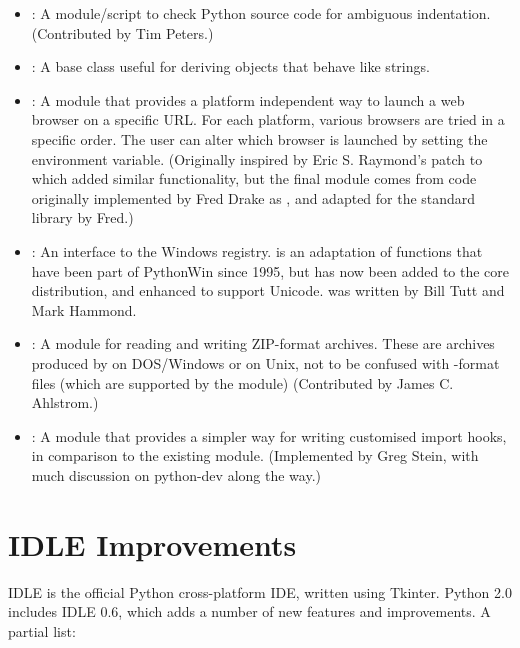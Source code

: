 \documentclass{howto}
\begin{document}
\begin{itemize}
\item{:} A module/script to 
check Python source code for ambiguous indentation.
(Contributed by Tim Peters.)

\item{:} A base class useful for deriving objects that behave like strings.  

\item{:} A module that provides a platform independent
way to launch a web browser on a specific URL. For each platform, various
browsers are tried in a specific order. The user can alter which browser
is launched by setting the  environment variable. 
(Originally inspired by Eric S. Raymond's patch to 
which added similar functionality, but
the final module comes from code originally 
implemented by Fred Drake as ,
and adapted for the standard library by Fred.)

\item{:} An interface to the
Windows registry.   is an adaptation of functions that
have been part of PythonWin since 1995, but has now been added to the core 
distribution, and enhanced to support Unicode.  
 was written by Bill Tutt and Mark Hammond.

\item{:} A module for reading and writing ZIP-format
archives.  These are archives produced by  on
DOS/Windows or  on Unix, not to be confused with
-format files (which are supported by the 
module)
(Contributed by James C. Ahlstrom.)

\item{:} A module that provides a simpler way for
writing customised import hooks, in comparison to the existing
 module.  (Implemented by Greg Stein, with much
discussion on python-dev along the way.)

\end{itemize}

\section{IDLE Improvements}

IDLE is the official Python cross-platform IDE, written using Tkinter.
Python 2.0 includes IDLE 0.6, which adds a number of new features and
improvements.  A partial list:
\end{document}
